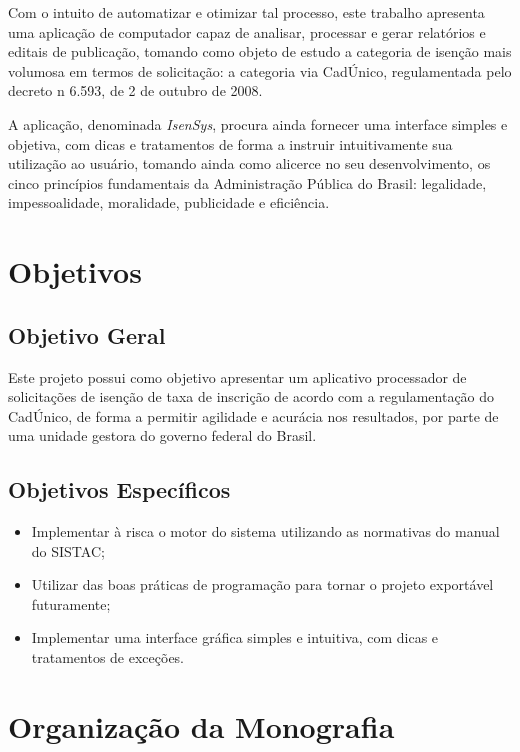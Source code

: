 \documentclass[
	12pt,			%
	openright,		%
	oneside,	
	a4paper,		%
	english,		%
	brazil			%
]{abntex2/abntex2}  %
\begin{document}
		Com o intuito de automatizar e otimizar tal processo, este trabalho apresenta uma aplicação de computador capaz de analisar, processar e gerar relatórios e editais de publicação, tomando como objeto de estudo a categoria de isenção mais volumosa em termos de solicitação: a categoria via CadÚnico, regulamentada pelo decreto n{\textdegree} 6.593, de 2 de outubro de 2008.
		
		A aplicação, denominada \textit{IsenSys}, procura ainda fornecer uma interface simples e objetiva, com dicas e tratamentos de forma a instruir intuitivamente sua utilização ao usuário, tomando ainda como alicerce no seu desenvolvimento, os cinco princípios fundamentais da Administração Pública do Brasil: legalidade, impessoalidade, moralidade, publicidade e eficiência.

		\section{Objetivos}
		
			\subsection{Objetivo Geral}
			
			Este projeto possui como objetivo apresentar um aplicativo processador de solicitações de isenção de taxa de inscrição de acordo com a regulamentação do CadÚnico, de forma a permitir agilidade e acurácia nos resultados, por parte de uma unidade gestora do governo federal do Brasil.
			
			\subsection{Objetivos Específicos}
			
			\begin{itemize}
				
				\item Implementar à risca o motor do sistema utilizando as normativas do manual do SISTAC;
				\item Utilizar das boas práticas de programação para tornar o projeto exportável futuramente;
				\item Implementar uma interface gráfica simples e intuitiva, com dicas e tratamentos de exceções.
				
			\end{itemize}
		
		\section{Organização da Monografia}
		
\end{document}
